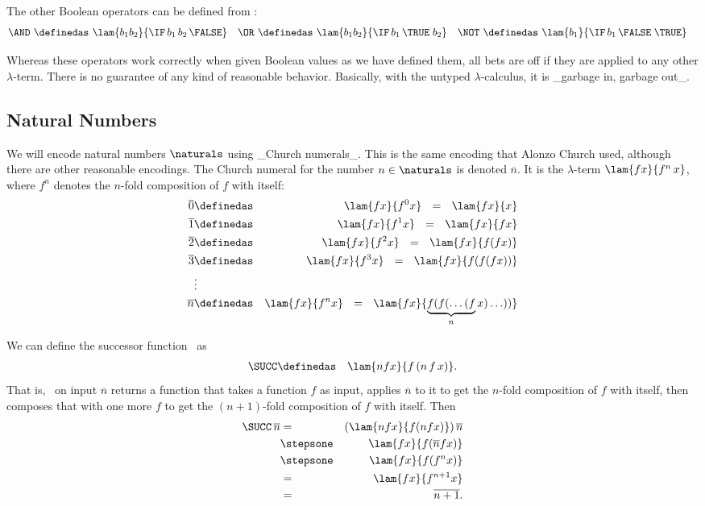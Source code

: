 The other Boolean operators can be defined from \IF:
\begin{align*}
\AND\ &\definedas\ \lam{b_1b_2}{\IF\,b_1\,b_2\,\FALSE} &
\OR\ &\definedas\ \lam{b_1b_2}{\IF\,b_1\,\TRUE\;b_2} &
\NOT\ &\definedas\ \lam{b_1}{\IF\,b_1\,\FALSE\;\TRUE}
\end{align*}

Whereas these operators work correctly when given Boolean values as we have defined them, all bets are off if they are applied to any other $\lambda$-term.  There is no guarantee of any kind of reasonable behavior.  Basically, with the untyped $\lambda$-calculus, it is _garbage in, garbage out_.

\subsection{Natural Numbers}

We will encode natural numbers $\naturals$ using _Church numerals_.  This is the same encoding that Alonzo Church used, although there are other reasonable encodings.  The Church numeral for the number $n\in\naturals$ is denoted $\overline n$.  It is the $\lambda$-term $\lam{fx}{f^n\,x}$, where $f^n$ denotes the $n$-fold composition of $f$ with itself:
\begin{eqnarray*}
\overline 0 &\definedas& \lam{fx}{f^0x}\ \ =\ \ \lam{fx}{x}\\
\overline 1 &\definedas& \lam{fx}{f^1x}\ \ =\ \ \lam{fx}{fx}\\
\overline 2 &\definedas& \lam{fx}{f^2x}\ \ =\ \ \lam{fx}{f(fx)}\\
\overline 3 &\definedas& \lam{fx}{f^3x}\ \ =\ \ \lam{fx}{f(f(fx))}\\
&\vdots\\
\overline n &\definedas& \lam{fx}{f^nx}\ \ =\ \ \lam{fx}{\underbrace{f(f(\ldots(f}_nx)\ldots))}
\end{eqnarray*}

We can define the successor function \SUCC\ as
\begin{eqnarray*}
\SUCC &\definedas& \lam{nfx}{f\,(n\,f\,x)}.
\end{eqnarray*}
That is, \SUCC\ on input $\overline n$ returns a function that takes a function $f$ as input, applies $\overline n$ to it to get the $n$-fold composition of $f$ with itself, then composes that with one more $f$ to get the $(n+1)$-fold composition of $f$ with itself.  Then
\begin{eqnarray*}
\SUCC\,\overline n &=& (\lam{nfx}{f(nfx)})\,\overline n\\
&\stepsone& \lam{fx}{f(\overline nfx)}\\
&\stepsone& \lam{fx}{f(f^nx)}\\
&=& \lam{fx}{f^{n+1}x}\\
&=& \overline{n+1}.
\end{eqnarray*}

